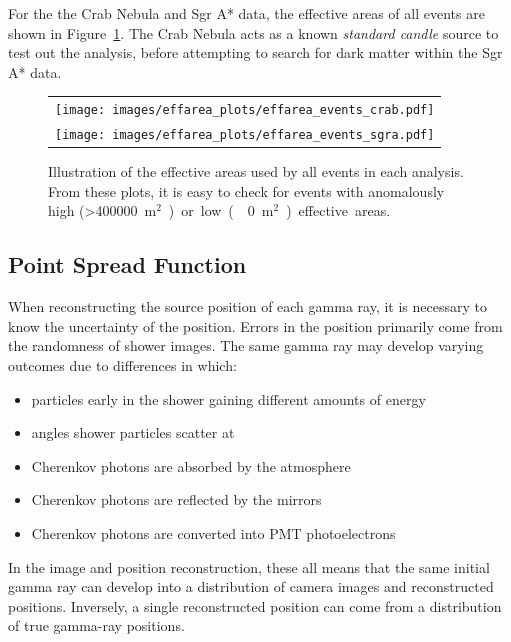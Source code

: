 For the the Crab Nebula and Sgr A* data, the effective areas of all events are shown in Figure~\ref{fig:effarea_usage}.
The Crab Nebula acts as a known \textit{standard candle} source to test out the analysis, before attempting to search for dark matter within the Sgr A* data.
    
    \begin{figure}[!t]
      \centering
      \begin{tabular}{c}
        \texttt{[image: images/effarea\_plots/effarea\_events\_crab.pdf]} \\
        \texttt{[image: images/effarea\_plots/effarea\_events\_sgra.pdf]}
      \end{tabular}
      \caption[Effective Areas Used]{
      Illustration of the effective areas used by all events in each analysis.
      From these plots, it is easy to check for events with anomalously high (>\SI{400000}{m${}^2$}) or low (\nicetilde\SI{0}{m${}^2$}) effective areas.
      }
      \label{fig:effarea_usage}
    \end{figure}
  
  \FloatBarrier

  \subsection{Point Spread Function}\label{subsec:psf}

    When reconstructing the source position of each gamma ray, it is necessary to know the uncertainty of the position.
    Errors in the position primarily come from the randomness of shower images.
    The same gamma ray may develop varying outcomes due to differences in which:
    \begin{itemize}[label=$\bullet$,noitemsep]
      \item particles early in the shower gaining different amounts of energy
      \item angles shower particles scatter at
      \item Cherenkov photons are absorbed by the atmosphere
      \item Cherenkov photons are reflected by the mirrors
      \item Cherenkov photons are converted into PMT photoelectrons
    \end{itemize}
    In the image and position reconstruction, these all means that the same initial gamma ray can develop into a distribution of camera images and reconstructed positions.
    Inversely, a single reconstructed position can come from a distribution of true gamma-ray positions.

